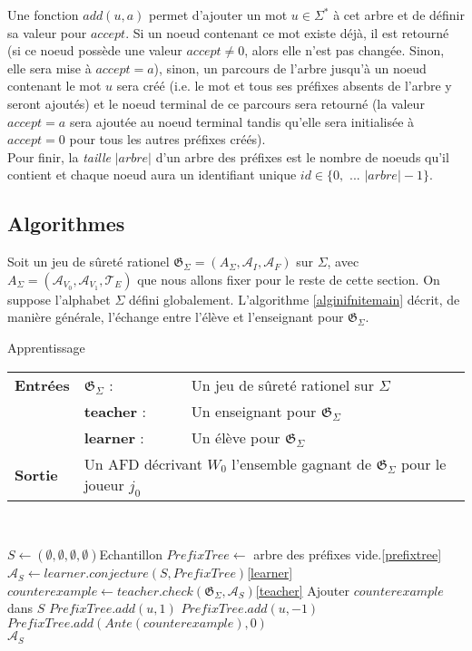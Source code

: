 \documentclass[12pt,a4paper,oneside,titlepage]{report}
\begin{document}
Une fonction $add(u, a)$ permet d'ajouter un mot $u\in\Sigma^*$ à cet arbre et de définir sa valeur pour $accept$. Si un noeud contenant ce mot existe déjà, il est retourné (si ce noeud possède une valeur $accept\neq 0$, alors elle n'est pas changée. Sinon, elle sera mise à $accept=a$), sinon, un parcours de l'arbre jusqu'à un noeud contenant le mot $u$ sera créé (i.e. le mot et tous ses préfixes absents de l'arbre y seront ajoutés) et le noeud terminal de ce parcours sera retourné (la valeur $accept=a$ sera ajoutée au noeud terminal tandis qu'elle sera initialisée à $accept=0$ pour tous les autres préfixes créés).\\
Pour finir, la \emph{taille} $|arbre|$ d'un arbre des préfixes est le nombre de noeuds qu'il contient et chaque noeud aura un identifiant unique $id\in\{0,$ $...$ $|arbre|-1\}$.

\subsection{Algorithmes}
Soit un jeu de sûreté rationel $\mathfrak{G}_\Sigma=(A_\Sigma, \mathcal{A}_I, \mathcal{A}_F)$ sur $\Sigma$, avec $A_\Sigma=(\mathcal{A}_{V_0}, \mathcal{A}_{V_1}, \mathcal{T}_E)$ que nous allons fixer pour le reste de cette section. On suppose l'alphabet $\Sigma$ défini globalement. L'algorithme \ref{alginifnitemain} décrit, de manière générale, l'échange entre l'élève et l'enseignant pour $\mathfrak{G}_\Sigma$.
\begin{algorithm}[H]
\caption{Apprentissage}\label{alginifnitemain}
\hspace*{\algorithmicindent} 
\begin{tabular}{lll}
	\textbf{Entrées} & \textbf{$\mathfrak{G}_\Sigma$} : &Un jeu de sûreté rationel sur $\Sigma$\\
	&\textbf{teacher} : &Un enseignant pour $\mathfrak{G}_\Sigma$\\
	&\textbf{learner} : &Un élève pour $\mathfrak{G}_\Sigma$\\
	\textbf{Sortie} &\multicolumn{2}{l}{Un AFD décrivant $W_0$ l'ensemble gagnant de $\mathfrak{G}_\Sigma$ pour le joueur $j_0$}\\
\end{tabular}\\
\begin{algorithmic}[1]
\State $S\gets(\emptyset,\emptyset,\emptyset,\emptyset)$\Comment Echantillon
\State $PrefixTree\gets$ arbre des préfixes vide.\Comment\ref{prefixtree}
\Repeat
	\State $\mathcal{A}_S \gets learner.conjecture(S, PrefixTree)$\Comment \ref{learner}
	\State $counterexample\gets teacher.check(\mathfrak{G}_\Sigma, \mathcal{A}_S)$\Comment\ref{teacher}
		\State Ajouter $counterexample$ dans $S$
			\State $PrefixTree.add(u, 1)$
			\State $PrefixTree.add(u, -1)$
		\Else
			\State $PrefixTree.add(Ante(counterexample), 0)$
		\EndIf
	\EndIf	
{}\\
\Return $\mathcal{A}_S$
\end{algorithmic}
\end{algorithm}
\end{document}
